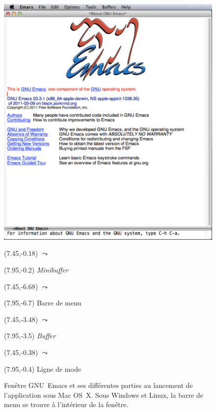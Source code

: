 \begin{figure}[t]
  \includegraphics{emacswindow-screenshot}

  \begin{textblock}{0.35}(7.45,-0.18)
    \LARGE$\leadsto$
  \end{textblock}
  \begin{textblock}{1.75}(7.95,-0.2)
    \small \emph{Minibuffer}
  \end{textblock}

  \begin{textblock}{0.35}(7.45,-6.68)
    \LARGE$\leadsto$
  \end{textblock}
  \begin{textblock}{1.75}(7.95,-6.7)
    \small Barre de menu
  \end{textblock}

  \begin{textblock}{0.35}(7.45,-3.48)
    \LARGE$\leadsto$
  \end{textblock}
  \begin{textblock}{1.75}(7.95,-3.5)
    \small \emph{Buffer}
  \end{textblock}

  \begin{textblock}{0.35}(7.45,-0.38)
    \LARGE$\leadsto$
  \end{textblock}
  \begin{textblock}{1.75}(7.95,-0.4)
    \small Ligne de mode
  \end{textblock}
  \caption{Fenêtre GNU~Emacs et ses différentes parties au lancement
    de l'application sous Mac OS~X. Sous Windows et Linux, la barre de
    menu se trouve à l'intérieur de la fenêtre.}
  \label{fig:ess:emacswindow}
\end{figure}


